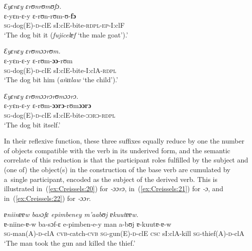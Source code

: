 \documentclass[output=paper]{langscibook}
\begin{document}
\ea
  \label{ex:Creissels:19}
  
    \ea\label{ex:Creissels:19a}
    
      \textit{Ɛyɛnɛy ɛrʊnrʊmʊfɔ.}\\
      \gll ɛ-yɛn-ɛ-y ɛ-rʊn-rʊm-ʊ-\textbf{fɔ}\\
      \textsc{sg}-dog(E)-\textsc{d}-clE sI:clE-bite-\textsc{rdpl-ep}-I:clF\\
      \glt `The dog bit it (\textit{fujicelɐf} `the male goat').'


    \ex\label{ex:Creissels:19b}
    
      \textit{Ɛyɛnɛy ɛrʊmɔɔrʊm.}\\
      \gll ɛ-yɛn-ɛ-y ɛ-rʊm-\textbf{ɔɔ}-rʊm\\
      \textsc{sg}-dog(E)-\textsc{d}-clE sI:clE-bite-I:clA-\textsc{rdpl}\\
      \glt `The dog bit him (\textit{añɩɩlaw} `the child').'


    \ex\label{ex:Creissels:19c}
    
      \textit{Ɛyɛnɛy ɛrʊmɔɔrɔrʊmɔɔrɔ.}\\
      \gll ɛ-yɛn-ɛ-y ɛ-rʊm-\textbf{ɔɔrɔ}-rʊm\textbf{ɔɔrɔ}\\
      \textsc{sg}-dog(E)-\textsc{d}-clE sI:clE-bite-\textsc{ɔɔrɔ-rdpl}\\
      \glt `The dog bit itself.'

  \z
\z

In their reflexive function, these three suffixes equally reduce by one the
number of objects compatible with the verb in its underived form, and the
semantic correlate of this reduction is that the participant roles fulfilled by
the subject and (one of) the object(s) in the construction of the base verb are
cumulated by a~single participant, encoded as the subject of the derived verb.
This is illustrated in~(\ref{ex:Creissels:20}) for \textit{‑ɔɔrɔ}, in~(\ref{ex:Creissels:21})
for \textit{‑ɔ}, and in~(\ref{ex:Creissels:22}) for \textit{‑ɔɔr}.

\ea
  \label{ex:Creissels:20}
  
    \ea\label{ex:Creissels:20a}
    
      \textit{ɐniinɐɐw basɔfɛ epimbeney m'aabʊj ɐkuutɐɐw.}\\
      \gll ɐ-niine-ɐ-w ba-sɔf-ɛ e-pimben-e-y man a-bʊj ɐ-kuutɐ-ɐ-w\\
      \textsc{sg}-man(A)-\textsc{d}-clA \textsc{cvb}-catch-\textsc{cvb} \textsc{sg}-gun(E)-\textsc{d}-clE \textsc{csc} sI:clA-kill \textsc{sg}-thief(A)-\textsc{d}-clA\\
      \glt `The man took the gun and killed the thief.'
\end{document}
